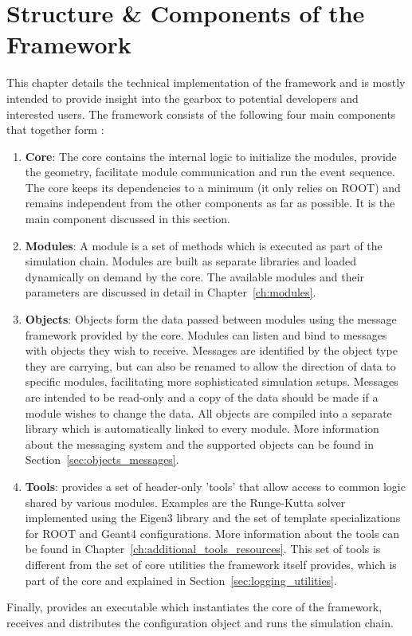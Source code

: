 \chapter{Structure \& Components of the Framework}
\label{ch:framework}

This chapter details the technical implementation of the \apsq framework and is mostly intended to provide insight into the gearbox to potential developers and interested users.
The framework consists of the following four main components that together form \apsq:
\begin{enumerate}
\item \textbf{Core}: The core contains the internal logic to initialize the modules, provide the geometry, facilitate module communication and run the event sequence.
The core keeps its dependencies to a minimum (it only relies on ROOT) and remains independent from the other components as far as possible.
It is the main component discussed in this section.
\item \textbf{Modules}: A module is a set of methods which is executed as part of the simulation chain.
Modules are built as separate libraries and loaded dynamically on demand by the core.
The available modules and their parameters are discussed in detail in Chapter~\ref{ch:modules}.
\item \textbf{Objects}: Objects form the data passed between modules using the message framework provided by the core.
Modules can listen and bind to messages with objects they wish to receive.
Messages are identified by the object type they are carrying, but can also be renamed to allow the direction of data to specific modules, facilitating more sophisticated simulation setups.
Messages are intended to be read-only and a copy of the data should be made if a module wishes to change the data.
All objects are compiled into a separate library which is automatically linked to every module.
More information about the messaging system and the supported objects can be found in Section~\ref{sec:objects_messages}.
\item \textbf{Tools}: \apsq provides a set of header-only 'tools' that allow access to common logic shared by various modules.
Examples are the Runge-Kutta solver~\cite{fehlberg} implemented using the Eigen3 library and the set of template specializations for ROOT and Geant4 configurations.
More information about the tools can be found in Chapter~\ref{ch:additional_tools_resources}.
This set of tools is different from the set of core utilities the framework itself provides, which is part of the core and explained in Section~\ref{sec:logging_utilities}.
\end{enumerate}
Finally, \apsq provides an executable which instantiates the core of the framework, receives and distributes the configuration object and runs the simulation chain.

